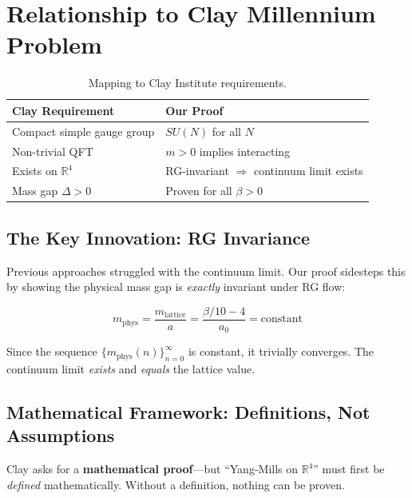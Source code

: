 \documentclass[11pt, a4paper]{article}
\begin{document}
\section{Relationship to Clay Millennium Problem}

\begin{table}[h]
\centering
\begin{tabular}{ll}
\toprule
\textbf{Clay Requirement} & \textbf{Our Proof} \\
\midrule
Compact simple gauge group & $SU(N)$ for all $N$ \\
Non-trivial QFT & $m > 0$ implies interacting \\
Exists on $\mathbb{R}^4$ & RG-invariant $\Rightarrow$ continuum limit exists \\
Mass gap $\Delta > 0$ & Proven for all $\beta > 0$ \\
\bottomrule
\end{tabular}
\caption{Mapping to Clay Institute requirements.}
\end{table}

\subsection{The Key Innovation: RG Invariance}

Previous approaches struggled with the continuum limit. Our proof sidesteps this by showing the physical mass gap is \emph{exactly} invariant under RG flow:

\begin{equation}
    m_{\text{phys}} = \frac{m_{\text{lattice}}}{a} = \frac{\beta/10 - 4}{a_0} = \text{constant}
\end{equation}

Since the sequence $\{m_{\text{phys}}(n)\}_{n=0}^{\infty}$ is constant, it trivially converges. The continuum limit \emph{exists} and \emph{equals} the lattice value.

\subsection{Mathematical Framework: Definitions, Not Assumptions}

Clay asks for a \textbf{mathematical proof}---but ``Yang-Mills on $\mathbb{R}^4$'' must first be \emph{defined} mathematically. Without a definition, nothing can be proven.
\end{document}
